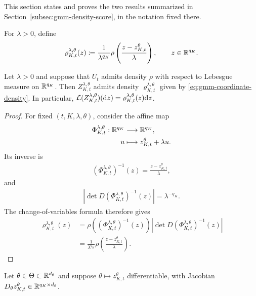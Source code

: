 This section states and proves the two results summarized in Section~\ref{subsec:gmm-density-score}, in the notation fixed there.

For $\lambda > 0$, define
\begin{align}
    \label{eq:gmm-coordinate-density}
    \varrho_{K,t}^{\lambda,\theta}(z) \coloneqq \frac{1}{\lambda^{q_K}}\rho\left(\frac{z-z_{K,t}^\theta}{\lambda}\right),\qquad z\in\mathbb{R}^{q_K}.
\end{align}

\begin{proposition}
    \label{prop:gmm-coordinate-density}
    Let $\lambda>0$ and suppose that $U_t$ admits density $\rho$ with respect to Lebesgue measure on $\mathbb{R}^{q_K}$. Then $Z_{K,t}^{\lambda,\theta}$ admits density $\varrho_{K,t}^{\lambda,\theta}$ given by \eqref{eq:gmm-coordinate-density}. In particular, ${\cal L}(Z_{K,t}^{\lambda,\theta})(\mathrm{d} z) = \varrho_{K,t}^{\lambda,\theta}(z)\mathrm{d} z$.
\end{proposition}

\begin{proof}
For fixed $(t,K,\lambda,\theta)$, consider the affine map
\begin{align}
    \Phi_{K,t}^{\lambda,\theta}:\mathbb{R}^{q_K} &\longrightarrow\mathbb{R}^{q_K},\\
    u &\longmapsto z_{K,t}^\theta + \lambda u.
\end{align}
Its inverse is
\begin{align}
    \left(\Phi_{K,t}^{\lambda,\theta}\right)^{-1}(z) = \frac{z-z_{K,t}^\theta}{\lambda},
\end{align}
and
\begin{align}
    \left|\det D\left(\Phi_{K,t}^{\lambda,\theta}\right)^{-1}(z)\right| = \lambda^{-q_K}.
\end{align}
The change-of-variables formula therefore gives
\begin{align}
    \varrho_{K,t}^{\lambda,\theta}(z) &= \rho\left(\left(\Phi_{K,t}^{\lambda,\theta}\right)^{-1}(z)\right)\left|\det D\left(\Phi_{K,t}^{\lambda,\theta}\right)^{-1}(z) \right| \\
    &= \frac{1}{\lambda^{q_K}}\rho\left(\frac{z-z_{K,t}^{\theta}}{\lambda} \right).
\end{align}
\end{proof}

Let $\theta\in\Theta\subset\mathbb{R}^{d_\theta}$ and suppose $\theta\mapsto z_{K,t}^\theta$ differentiable, with Jacobian $D_\theta z_{K,t}^\theta\in\mathbb{R}^{q_K\times d_\theta}$.

